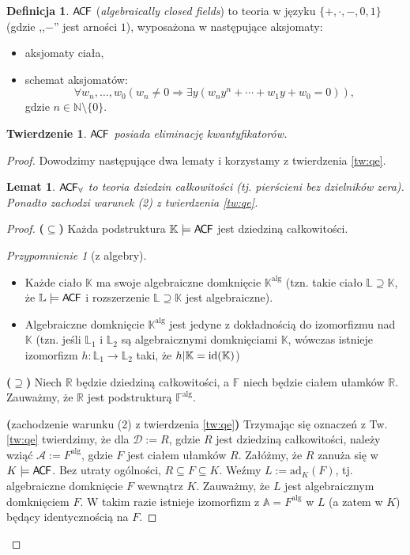 \documentclass{article}
\newcommand{\N}{\mathbb{N}}
\newcommand{\A}{\mathbb{A}}
\newcommand{\id}{\textnormal{id}}
\theoremstyle{plain}
\newtheorem{tw}[thm]{Twierdzenie}
\newtheorem{lem}[thm]{Lemat}
\theoremstyle{definition}
\newtheorem{df}[thm]{Definicja}
\theoremstyle{remark}
\newtheorem{przyp}[thm]{Przypomnienie}
\newcommand{\ACF}{\mathsf{A \mkern-2.0mu C \mkern-1.1mu F}}
\begin{document}
\begin{df}
	$\ACF$ (\textit{algebraically closed fields}) to teoria w języku $\{+,
	\cdot, -, 0, 1\}$ (gdzie ,,$-$'' jest arności $1$), wyposażona w
	następujące aksjomaty:
	\begin{itemize}
		\item aksjomaty ciała,
		\item schemat aksjomatów:
		$$\forall w_n, \ldots, w_0
			(w_n \neq 0 \Rightarrow
			\exists y (w_n y^n + \cdots + w_1y + w_0 = 0)),$$
			gdzie $n \in \N \setminus \{0\}$.
	\end{itemize}
\end{df}

\begin{tw}
	$\ACF$ posiada eliminację kwantyfikatorów.
\end{tw}
\begin{proof}
Dowodzimy następujące dwa lematy i korzystamy z twierdzenia \ref{tw:qe}.

\begin{lem}
	$\ACF_{\forall}$ to teoria dziedzin całkowitości (tj. pierścieni bez
	dzielników zera). Ponadto zachodzi warunek (2) z twierdzenia \ref{tw:qe}.
\end{lem}
\begin{proof}
	\textbf{($\subseteq$)} Każda podstruktura $\mathbb{K} \models \ACF$
	jest dziedziną całkowitości.
\begin{przyp}[z algebry]
	~\begin{itemize}
		\item Każde ciało $\mathbb{K}$ ma swoje algebraiczne domknięcie
			$\mathbb{K}^{\text{alg}}$ (tzn. takie ciało $\mathbb{L}
			\supseteq \mathbb{K}$, że $\mathbb{L} \models \ACF$ i
			rozszerzenie $\mathbb{L} \supseteq \mathbb{K}$ jest
			algebraiczne).
		\item Algebraiczne domknięcie $\mathbb{K}^{\text{alg}}$ jest
			jedyne z dokładnością do izomorfizmu nad $\mathbb{K}$
			(tzn. jeśli $\mathbb{L}_1$ i $\mathbb{L}_2$ są
			algebraicznymi domknięciami $\mathbb{K}$, wówczas
			istnieje izomorfizm $h \colon \mathbb{L}_1
			\rightarrow \mathbb{L}_2$ taki, że $h|\mathbb{K} =
			\id(\mathbb{K})$)
	\end{itemize}
\end{przyp}
	\textbf{($\supseteq$)}
	Niech $\mathbb{R}$ będzie dziedziną całkowitości, a $\mathbb{F}$ niech
	będzie ciałem ułamków $\mathbb{R}$. Zauważmy, że $\mathbb{R}$ jest
	podstrukturą $\mathbb{F}^\text{alg}$.

	\textbf{(}zachodzenie warunku (2) z twierdzenia \ref{tw:qe}\textbf{)}
	Trzymając się oznaczeń z Tw. \ref{tw:qe} twierdzimy, że dla
	$\mathcal{D} := R$, gdzie $R$ jest dziedziną całkowitości, należy wziąć
	$\mathcal{A} := F^\text{alg}$, gdzie $F$ jest ciałem ułamków $R$.
	Załóżmy, że $R$ zanuża się w $K \models \ACF$. Bez utraty ogólności,
	$R \subseteq F \subseteq K$. Weźmy $L := \text{ad}_K(F)$, %
	tj. algebraiczne domknięcie $F$ wewnątrz $K$. Zauważmy, że $L$ jest
	algebraicznym domknięciem $F$. W takim razie istnieje izomorfizm
	z $\A = F^\text{alg}$ w $L$ (a zatem w $K$) będący identycznością na $F$.
\end{proof}


\end{proof}
\end{document}
